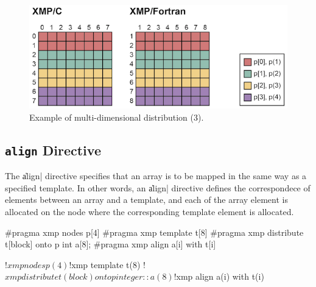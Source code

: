 
\begin{figure}
  \centering
  \includegraphics{figs/multi3.png}
  \caption{Example of multi-dimensional distribution (3).}
\end{figure}


\subsection{{\tt align} Directive}


The \|align| directive specifies that an array is to be mapped in the
same way as a specified template. In other words, an \|align| directive
defines the correspondece of elements between an array and a template,
and each of the array element is allocated on the node where the
corresponding template element is allocated.


\begin{XCexample}
#pragma xmp nodes p[4]
#pragma xmp template t[8]
#pragma xmp distribute t[block] onto p
int a[8];
#pragma xmp align a[i] with t[i]
\end{XCexample}

\begin{XFexample}
!$xmp nodes p(4)
!$xmp template t(8)
!$xmp distribute t(block) onto p
integer :: a(8)
!$xmp align a(i) with t(i)
\end{XFexample}

